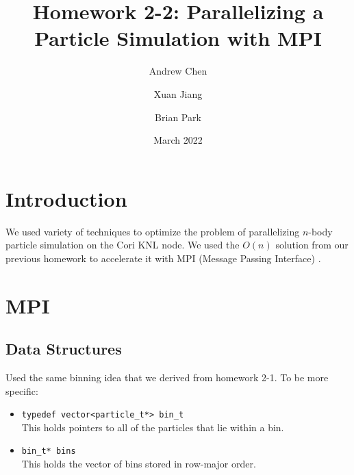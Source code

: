 \documentclass{article}
\title{Homework 2-2: Parallelizing a Particle Simulation with MPI}
\author{Andrew Chen}
\author{Xuan Jiang}
\author{Brian Park}
\affil{UC Berkeley, Computer Science 267}
\date{March 2022}
\begin{document}
\maketitle
\section{Introduction}
We used variety of techniques to optimize the problem of parallelizing $n$-body particle simulation on the Cori KNL node. We used the $O(n)$ solution from our previous homework to accelerate it with MPI (Message Passing Interface) \cite{mpi}.

\section{MPI}

\subsection{Data Structures}
Used the same binning idea that we derived from homework 2-1. To be more specific:

\begin{itemize}
	\item \verb|typedef vector<particle_t*> bin_t| \\
	      This holds pointers to all of the particles that lie within a bin.
	\item \verb|bin_t* bins| \\
	      This holds the vector of bins stored in row-major order.
\end{itemize}
\end{document}
